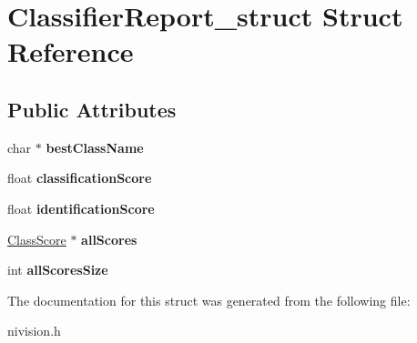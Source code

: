 \hypertarget{structClassifierReport__struct}{\section{\-Classifier\-Report\-\_\-struct \-Struct \-Reference}
\label{structClassifierReport__struct}
}
\subsection*{\-Public \-Attributes}
\begin{DoxyCompactItemize}
\item 
\hypertarget{structClassifierReport__struct_a5dbf439169d3f3a5bf361bd65fa739f9}{char $\ast$ {\bfseries best\-Class\-Name}}\label{structClassifierReport__struct_a5dbf439169d3f3a5bf361bd65fa739f9}

\item 
\hypertarget{structClassifierReport__struct_a76d07bf57683b72cbdcd9a6a1bc586cd}{float {\bfseries classification\-Score}}\label{structClassifierReport__struct_a76d07bf57683b72cbdcd9a6a1bc586cd}

\item 
\hypertarget{structClassifierReport__struct_ad4474ccccb21485d6e4b043a86d0fea8}{float {\bfseries identification\-Score}}\label{structClassifierReport__struct_ad4474ccccb21485d6e4b043a86d0fea8}

\item 
\hypertarget{structClassifierReport__struct_a82bb29115a79eae84b93d4940dccb07c}{\hyperlink{structClassScore__struct}{\-Class\-Score} $\ast$ {\bfseries all\-Scores}}\label{structClassifierReport__struct_a82bb29115a79eae84b93d4940dccb07c}

\item 
\hypertarget{structClassifierReport__struct_a60c6a5df95011dc6aee2c3af64f09bef}{int {\bfseries all\-Scores\-Size}}\label{structClassifierReport__struct_a60c6a5df95011dc6aee2c3af64f09bef}

\end{DoxyCompactItemize}


\-The documentation for this struct was generated from the following file\-:\begin{DoxyCompactItemize}
\item 
nivision.\-h\end{DoxyCompactItemize}
